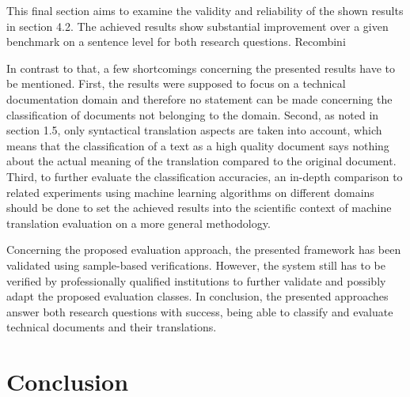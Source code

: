    
        This ﬁnal section aims to examine the validity and reliability of the shown results in section
    4.2.
    The achieved results show substantial improvement over a given benchmark on a sentence
    level for both research questions. Recombini
    
    
    In contrast to that, a few shortcomings concerning the presented results have to be mentioned.
    First, the results were supposed to focus on a technical documentation domain
    and therefore no statement can be made concerning the classiﬁcation of documents not
    belonging to the domain. Second, as noted in section 1.5, only syntactical translation
    aspects are taken into account, which means that the classiﬁcation of a text as a high
    quality document says nothing about the actual meaning of the translation compared to
    the original document. Third, to further evaluate the classiﬁcation accuracies, an in-depth
    comparison to related experiments using machine learning algorithms on different domains
    should be done to set the achieved results into the scientiﬁc context of machine
    translation evaluation on a more general methodology.
    
    Concerning the proposed evaluation approach, the presented framework has been validated
    using sample-based veriﬁcations. However, the system still has to be veriﬁed by
    professionally qualiﬁed institutions to further validate and possibly adapt the proposed
    evaluation classes. In conclusion, the presented approaches answer both research questions
    with success, being able to classify and evaluate technical documents and their translations.
    





\chapter{Conclusion}\label{chap:conclusion}
